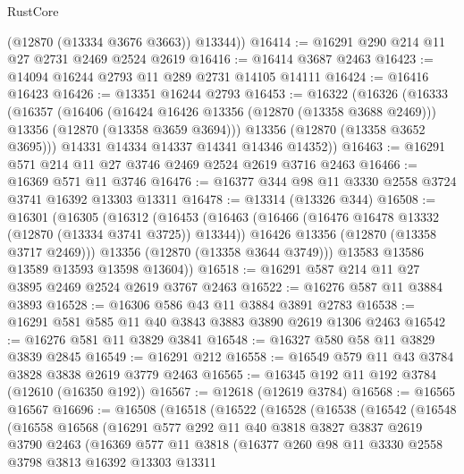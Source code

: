 \begin{lexlean}{RustCore}
\begin{coremodule}
        (@12870 (@13334 @3676 @3663))
        @13344))
@16414 := @16291 @290 @214 @11 @27 @2731 @2469 @2524 @2619
@16416 := @16414 @3687 @2463
@16423 := @14094 @16244 @2793 @11 @289 @2731 @14105 @14111
@16424 := @16416 @16423
@16426 := @13351 @16244 @2793
@16453 := @16322
    (@16326
      (@16333
        (@16357
          (@16406
            (@16424 @16426 @13356 (@12870 (@13358 @3688 @2469)))
            @13356
            (@12870 (@13358 @3659 @3694)))
          @13356
          (@12870 (@13358 @3652 @3695)))
        @14331
        @14334
        @14337
        @14341
        @14346
        @14352))
@16463 := @16291 @571 @214 @11 @27 @3746 @2469 @2524 @2619 @3716 @2463
@16466 := @16369 @571 @11 @3746
@16476 := @16377 @344 @98 @11 @3330 @2558 @3724 @3741 @16392 @13303 @13311
@16478 := @13314 (@13326 @344)
@16508 := @16301
    (@16305
      (@16312
        (@16453
          (@16463
            (@16466 (@16476 @16478 @13332 (@12870 (@13334 @3741 @3725)) @13344))
            @16426
            @13356
            (@12870 (@13358 @3717 @2469)))
          @13356
          (@12870 (@13358 @3644 @3749)))
        @13583
        @13586
        @13589
        @13593
        @13598
        @13604))
@16518 := @16291 @587 @214 @11 @27 @3895 @2469 @2524 @2619 @3767 @2463
@16522 := @16276 @587 @11 @3884 @3893
@16528 := @16306 @586 @43 @11 @3884 @3891 @2783
@16538 := @16291 @581 @585 @11 @40 @3843 @3883 @3890 @2619 @1306 @2463
@16542 := @16276 @581 @11 @3829 @3841
@16548 := @16327 @580 @58 @11 @3829 @3839 @2845
@16549 := @16291 @212
@16558 := @16549 @579 @11 @43 @3784 @3828 @3838 @2619 @3779 @2463
@16565 := @16345 @192 @11 @192 @3784 (@12610 (@16350 @192))
@16567 := @12618 (@12619 @3784)
@16568 := @16565 @16567
@16696 := @16508
    (@16518
      (@16522
        (@16528
          (@16538
            (@16542
              (@16548
                (@16558
                  @16568
                  (@16291
                    @577
                    @292
                    @11
                    @40
                    @3818
                    @3827
                    @3837
                    @2619
                    @3790
                    @2463
                    (@16369
                      @577
                      @11
                      @3818
                      (@16377
                        @260
                        @98
                        @11
                        @3330
                        @2558
                        @3798
                        @3813
                        @16392
                        @13303
                        @13311

\end{coremodule}
\end{lexlean}
